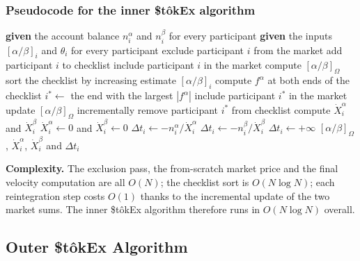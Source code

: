 \documentclass[letterpaper]{article}
\newcommand{\priceAB}{\left[\alpha / \beta\right]}
\newcommand{\StokEx}{\$t\^{o}kEx}
\begin{document}
\subsubsection{Pseudocode for the inner \StokEx{} algorithm}
\begin{algorithmic}[1]
    \STATE \textbf{given} the account balance $n_i^\alpha$ and $n_i^\beta$ for every participant
    \STATE \textbf{given} the inputs $\priceAB_i$ and $\theta_i$ for every participant
            \STATE exclude participant $i$ from the market
            \STATE add participant $i$ to checklist
        \ELSE
            \STATE include participant $i$ in the market
        \ENDIF
    \ENDFOR
    \STATE compute $\priceAB_\Omega$
    \STATE sort the checklist by increasing estimate $\priceAB_i$
        \STATE compute $f^\alpha$ at both ends of the checklist
        \STATE $i^{\ast} \gets$ the end with the largest $|f^\alpha|$
            \STATE include participant $i^{\ast}$ in the market
            \STATE update $\priceAB_\Omega$ incrementally
        \ENDIF
        \STATE remove participant $i^{\ast}$ from checklist
    \ENDWHILE
            \STATE compute $\dot{X}_i^\alpha$ and $\dot{X}_i^\beta$
        \ELSE
            \STATE $\dot{X}_i^\alpha \gets 0$ and $\dot{X}_i^\beta \gets 0$
        \ENDIF
            \STATE $\Delta t_i \gets - n_i^\alpha / \dot{X}_i^\alpha$
            \STATE $\Delta t_i \gets - n_i^\beta / \dot{X}_i^\beta$
        \ELSE
            \STATE $\Delta t_i \gets +\infty$
        \ENDIF
    \ENDFOR
    \RETURN $\priceAB_\Omega$, $\dot{X}_i^\alpha$, $\dot{X}_i^\beta$ and $\Delta t_i$
\end{algorithmic}

\textbf{Complexity.} The exclusion pass, the from-scratch market price and the final velocity computation are all $O(N)$; the checklist sort is $O(N \log N)$; each reintegration step costs $O(1)$ thanks to the incremental update of the two market sums. The inner \StokEx{} algorithm therefore runs in $O(N \log N)$ overall.
\clearpage


\subsection{Outer \StokEx{} Algorithm}
\end{document}

